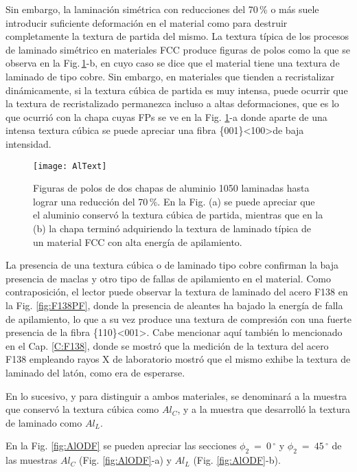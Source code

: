 Sin embargo, la laminación simétrica con reducciones del 70\,\% o más suele introducir suficiente deformación en el material como para destruir completamente la textura de partida del mismo.
La textura típica de los procesos de laminado simétrico en materiales FCC produce figuras de polos como la que se observa en la Fig.\,\ref{fig:AlPDF}-b, en cuyo caso se dice que el material tiene una textura de laminado de tipo cobre\cite{kocks2000texture}. Sin embargo, en materiales que tienden a recristalizar dinámicamente, si la textura cúbica de partida es muy intensa, puede ocurrir que la textura de recristalizado permanezca incluso a altas deformaciones, que es lo que ocurrió con la chapa cuyas FPs se ve en la Fig. \ref{fig:AlPDF}-a donde aparte de una intensa textura cúbica se puede apreciar una fibra \{001\}\textless 100\textgreater de baja intensidad.

\begin{figure}[!htb]
  \centering
  \texttt{[image: AlText]}
  \caption{Figuras de polos de dos chapas de aluminio 1050 laminadas hasta lograr una reducción del 70\,\%. En la Fig. (a) se puede apreciar que el aluminio conservó la textura cúbica de partida, mientras que en la (b) la chapa terminó adquiriendo la textura de laminado típica de un material FCC con alta energía de apilamiento.}
  \label{fig:AlPDF}
\end{figure}

La presencia de una textura cúbica o de laminado tipo cobre confirman la baja presencia de maclas y otro tipo de fallas de apilamiento en el material.
Como contraposición, el lector puede observar la textura de laminado del acero F138 en la Fig. \ref{fig:F138PF}, donde la presencia de aleantes ha bajado la energía de falla de apilamiento, lo que a su vez produce una textura de compresión con una fuerte presencia de la fibra \{110\}\textless 001\textgreater.
Cabe mencionar aquí también lo mencionado en el Cap. \ref{C:F138}, donde se mostró que la medición de la textura del acero F138 empleando rayos X de laboratorio mostró que el mismo exhibe la textura de laminado del latón, como era de esperarse.

En lo sucesivo, y para distinguir a ambos materiales, se denominará a la muestra que conservó la textura cúbica como $Al_C$, y a la muestra que desarrolló la textura de laminado como $Al_L$.

En la Fig. \ref{fig:AlODF} se pueden apreciar las secciones $\phi_2 \ = \ 0$\,$^{\circ}$ y $\phi_2 \ = \ 45$\,$^{\circ}$ de las muestras $Al_C$ (Fig. \ref{fig:AlODF}-a) y $Al_L$ (Fig. \ref{fig:AlODF}-b).

